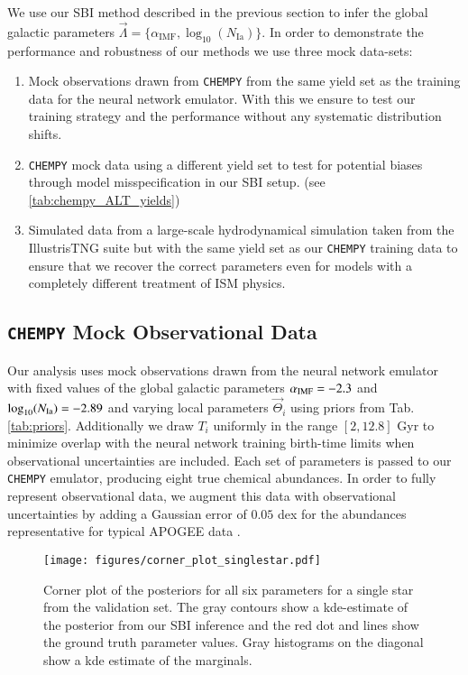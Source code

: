 \documentclass{aa}
\begin{document}
We use our SBI method described in the previous section to infer the global galactic parameters $\vec\Lambda = \{\alpha_\mathrm{IMF},\log_{10}(N_\mathrm{Ia})\}$. In order to demonstrate the performance and robustness of our methods we use three mock data-sets: 
\begin{enumerate}
    \item Mock observations drawn from \texttt{CHEMPY} from the same yield set as the training data for the neural network emulator. With this we ensure to test our training strategy and the performance without any systematic distribution shifts. 
    \item  \texttt{CHEMPY} mock data using a different yield set to test for potential biases through model misspecification in our SBI setup. (see  \ref{tab:chempy_ALT_yields})
    \item Simulated data from a large-scale hydrodynamical simulation taken from the IllustrisTNG suite \citep{Pillepich2018} but with the same yield set as our \texttt{CHEMPY} training data to ensure that we recover the correct parameters even for models with a completely different treatment of ISM physics.
\end{enumerate}

\subsection{\texttt{CHEMPY} Mock Observational Data}
\label{subsec:mock obs}
Our analysis uses mock observations drawn from the neural network emulator with fixed values of the global galactic parameters $\alpha_{\rm IMF}=-2.3$ and $\log_{10}(N_{\rm Ia})=-2.89$ and varying local parameters $\vec{\Theta}_i$ using priors from Tab. \ref{tab:priors}. Additionally we draw $T_i$ uniformly in the range $[2,12.8]$ Gyr to minimize overlap with the neural network training birth-time limits when observational uncertainties are included. 
Each set of parameters is passed to our \texttt{CHEMPY} emulator, producing eight true chemical abundances. In order to fully represent observational data, we augment this data with observational uncertainties by adding a Gaussian error of $0.05$ dex for the abundances representative for typical APOGEE data \citep{Majewski2016}.

\begin{figure*}
    \centering
    \texttt{[image: figures/corner\_plot\_singlestar.pdf]}
    \vspace{-.5cm}
    \caption{Corner plot of the posteriors for all six parameters for a single star from the validation set. The gray contours show a kde-estimate of the posterior from our SBI inference and the red dot and lines show the ground truth parameter values. Gray histograms on the diagonal show a kde estimate of the marginals.}
    \label{fig:corner_plot}
\end{figure*}
\end{document}
